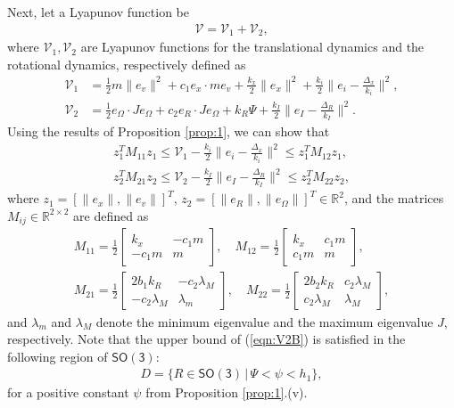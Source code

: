\documentclass[twocolumn,letterpaper]{IEEEAerospaceCLS}  %
\newcommand{\refeqn}[1]{(\ref{eqn:#1})}
\newcommand{\SO}{\ensuremath{\mathsf{SO(3)}}}
\renewcommand{\Re}{\mathbb{R}}
\begin{document}
Next, let a Lyapunov function be
\begin{align}
{\mathcal{V}} = {\mathcal{V}}_1 + {\mathcal{V}}_2,
\end{align}
where ${\mathcal{V}}_1,{\mathcal{V}}_2$ are Lyapunov functions for the translational dynamics and the rotational dynamics, respectively defined as
\begin{align*}
{\mathcal{V}}_1 & = \frac{1}{2} m\|e_v\|^2 + c_1 e_x\cdot me_v + \frac{k_x}{2}\|e_x\|^2 + \frac{k_i}{2}\|e_i-\frac{\Delta_x}{k_i}\|^2,\\
{\mathcal{V}}_2 & = \frac{1}{2} e_\Omega\cdot Je_\Omega + c_2 e_R\cdot Je_\Omega + k_R \Psi + \frac{k_I}{2}\|e_I-\frac{\Delta_R}{k_I}\|^2.
\end{align*}
Using the results of Proposition \ref{prop:1}, we can show that
\begin{gather}
z_1^T M_{11} z_1 \leq {\mathcal{V}}_1-\frac{k_i}{2}\|e_i-\frac{\Delta_x}{k_i}\|^2 \leq z_1^T M_{12} z_1,\\
z_2^T M_{21} z_2 \leq {\mathcal{V}}_2-\frac{k_I}{2}\|e_I-\frac{\Delta_R}{k_I}\|^2 \leq z_2^T M_{22} z_2,\label{eqn:V2B}
\end{gather}
where $z_1=[\|e_x\|,\|e_v\|]^T$, $z_2=[\|e_R\|,\|e_\Omega\|]^T\in{\Re}^2$, and the matrices $M_{ij}\in{\Re}^{2\times 2}$ are defined as
\begin{gather*}
M_{11}=\frac{1}{2}\begin{bmatrix} k_x & -c_1m\\-c_1m & m\end{bmatrix},\quad
M_{12}=\frac{1}{2}\begin{bmatrix} k_x & c_1m\\c_1m & m\end{bmatrix},\\
M_{21}=\frac{1}{2}\begin{bmatrix} 2b_1k_R & -c_2\lambda_M\\-c_2\lambda_M & \lambda_m\end{bmatrix},\quad
M_{22}=\frac{1}{2}\begin{bmatrix} 2b_2k_R & c_2\lambda_M\\c_2\lambda_M & \lambda_M\end{bmatrix},
\end{gather*}
and $\lambda_m$ and $\lambda_M$ denote the minimum eigenvalue and the maximum eigenvalue $J$, respectively. Note that the upper bound of \refeqn{V2B} is satisfied in the following region of $\SO$:
\begin{align}
D=\{R\in{\SO}\,|\, \Psi < \psi <h_1\},\label{eqn:D}
\end{align}
for a positive constant $\psi$ from Proposition \ref{prop:1}.(v).
\end{document}
